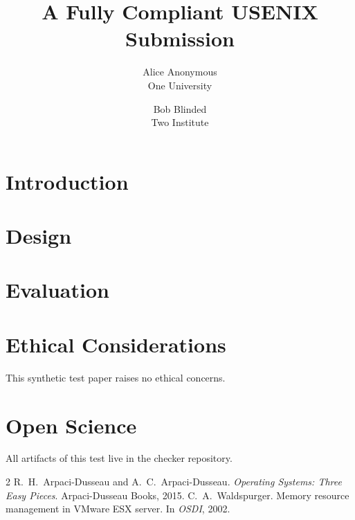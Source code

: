 \documentclass[letterpaper,twocolumn,10pt]{article}
\date{}
\title{\Large \bf A Fully Compliant USENIX Submission}
\author{{\rm Alice Anonymous}\\One University \and {\rm Bob Blinded}\\Two Institute}
\begin{document}
\maketitle

\begin{abstract}
\lipsum[1][1-5]
\end{abstract}

\section{Introduction}
\lipsum[2-4]

\section{Design}
\lipsum[5-7]

\section{Evaluation}
\lipsum[8-9]

\appendix
\section*{Ethical Considerations}
This synthetic test paper raises no ethical concerns.

\section*{Open Science}
All artifacts of this test live in the checker repository.

\begin{thebibliography}{2}
 R.~H.\ Arpaci-Dusseau and A.~C.\ Arpaci-Dusseau.
  \emph{Operating Systems: Three Easy Pieces}. Arpaci-Dusseau Books, 2015.
 C.~A.\ Waldspurger. Memory resource management in VMware ESX
  server. In \emph{OSDI}, 2002.
\end{thebibliography}
\end{document}
